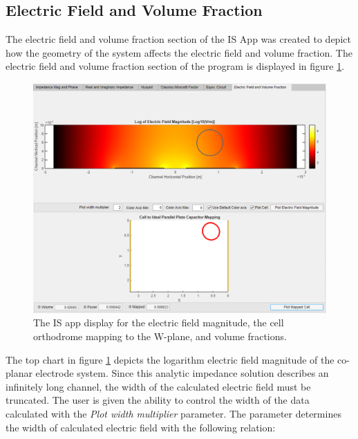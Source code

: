 \subsection*{Electric Field and Volume Fraction}

\par The electric field and volume fraction section of the IS App was created to depict how the geometry of the system affects the electric field and volume fraction. The electric field and volume fraction section of the program is displayed in figure \ref{fig:is_app_Efield_volume_fraction}. 

\begin{figure}[h]
    \centering
    \includegraphics[width=\textwidth]{images/impedanceDisplayEFieldVFs.png}
    \caption[IS app display of the electric field and volume fraction.]{The IS app display for the electric field magnitude, the cell orthodrome mapping to the W-plane, and volume fractions.}
    \label{fig:is_app_Efield_volume_fraction}
\end{figure}

\par The top chart in figure \ref{fig:is_app_Efield_volume_fraction} depicts the logarithm electric field magnitude of the co-planar electrode system. Since this analytic impedance solution describes an infinitely long channel, the width of the calculated electric field must be truncated. The user is given the ability to control the width of the data calculated with the \textit{Plot width multiplier} parameter. The parameter determines the width of calculated electric field with the following relation:

